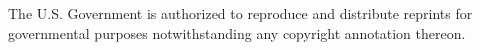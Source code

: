 \documentclass[utf8]{frontiersSCNS}
\begin{document}
The U.S. Government is authorized to reproduce and distribute reprints for governmental purposes notwithstanding any copyright annotation thereon.
%
%
%
%



\end{document}

